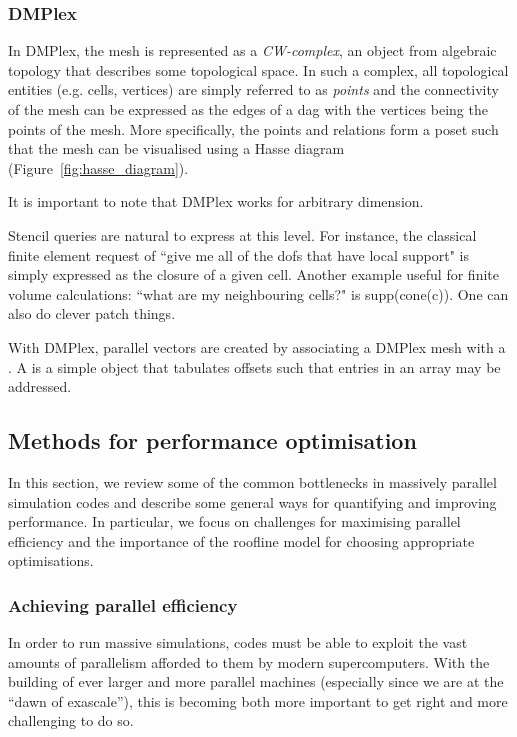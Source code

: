 \subsubsection{DMPlex}
\label{sec:background_mesh_dmplex}


In DMPlex, the mesh is represented as a \textit{CW-complex}, an object from algebraic topology that describes some topological space.
In such a complex, all topological entities (e.g. cells, vertices) are simply referred to as \textit{points} and the connectivity of the mesh can be expressed as the edges of a \gls{dag} with the vertices being the points of the mesh.
More specifically, the points and relations form a \gls{poset} such that the mesh can be visualised using a Hasse diagram (Figure~\ref{fig:hasse_diagram}).

It is important to note that DMPlex works for arbitrary dimension.


Stencil queries are natural to express at this level.
For instance, the classical finite element request of ``give me all of the \glspl{dof} that have local support" is simply expressed as the closure of a given cell.
Another example useful for finite volume calculations: ``what are my neighbouring cells?" is supp(cone(c)).
One can also do clever patch things.

With DMPlex, parallel vectors are created by associating a DMPlex mesh with a .
A  is a simple object that tabulates offsets such that entries in an array may be addressed.

\subsection{Methods for performance optimisation}

In this section, we review some of the common bottlenecks in massively parallel simulation codes and describe some general ways for quantifying and improving performance.
In particular, we focus on challenges for maximising parallel efficiency and the importance of the roofline model for choosing appropriate optimisations.

\subsubsection{Achieving parallel efficiency}
\label{sec:background_perf_efficiency}

In order to run massive simulations, codes must be able to exploit the vast amounts of parallelism afforded to them by modern supercomputers.
With the building of ever larger and more parallel machines (especially since we are at the ``dawn of exascale''), this is becoming both more important to get right and more challenging to do so.

